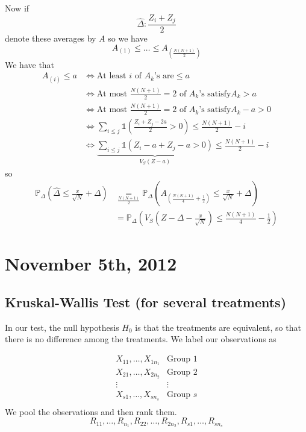 \documentclass[a4paper,12pt]{amsart}
\begin{document}
Now if 
\[\widehat{\Delta} : \frac{Z_i + Z_j}{2}\]
denote these averages by $A$ so we have
\[A_{(1)} \leq \ldots \leq A_{\left(\frac{N(N+1)}{2}\right)}\]
We have that
\begin{align*}
A_{(i)} \leq a &\Leftrightarrow \text{At least $i$ of $A_k$'s are} \leq a\\
&\Leftrightarrow \text{At most $\frac{N(N+1)}{2}=2$ of $A_k$'s satisfy} A_k >a\\
&\Leftrightarrow \text{At most $\frac{N(N+1)}{2}=2$ of $A_k$'s satisfy} A_k - a > 0\\
&\Leftrightarrow \sum_{i \leq j} \mathds{1}\left(\frac{Z_i + Z_j - 2a}{2}>0\right) \leq \frac{N(N+1)}{2}-i\\
&\Leftrightarrow \underbrace{\sum_{i \leq j}\mathds{1}\left(Z_i - a + Z_j - a >0\right)}_{V_S(Z-a)} \leq \frac{N(N+1)}{2} - i
\end{align*}
so
\begin{align*}
\mathbb{P}_\Delta \left(\widehat{\Delta} \leq \frac{x}{\sqrt{N}} + \Delta \right) &\underset{\frac{N(N+1)}{2}}{=} \mathbb{P}_\Delta \left(A_{\left(\frac{N(N+1)}{4} + \frac{1}{2}\right)} \leq \frac{x}{\sqrt{N}} + \Delta \right)\\
&= \mathbb{P}_\Delta\left(V_S \left(Z - \Delta - \frac{x}{\sqrt{N}}\right) \leq \frac{N(N+1)}{4} - \frac{1}{2}\right)
\end{align*}




\section{November 5th, 2012}
\subsection{Kruskal-Wallis Test (for several treatments)}
In our test, the null hypothesis $H_0$ is that the treatments are equivalent, so that there is no difference among the treatments. We label our observations as

\[\begin{array}{cc}
X_{11},\ldots,X_{1n_1} & \text{Group } 1\\
X_{21},\ldots,X_{2n_2} & \text{Group } 2\\
\vdots & \vdots\\
X_{s1},\ldots,X_{sn_s} & \text{Group } s\\
\end{array}\]
We pool the observations and then rank them.
\[R_{11},\ldots, R_{n_1}, R_{22},\ldots, R_{2n_2},R_{s1},\ldots, R_{sn_s}\] 
\end{document}
